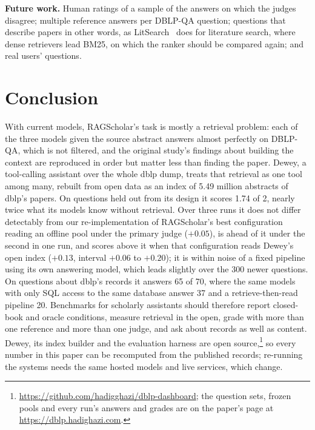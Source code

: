 \documentclass[conference]{IEEEtran}
\newcommand{\dq}{DBLP-QA}
\begin{document}
\textbf{Future work.} Human ratings of a sample of the answers on which the judges disagree; multiple
reference answers per \dq{} question; questions that describe papers in other words, as
LitSearch~\cite{ajith2024litsearch} does for literature search, where dense retrievers lead BM25, on
which the ranker should be compared again; and real users' questions.

\section{Conclusion}

With current models, RAGScholar's task is mostly a retrieval problem: each of the three models given
the source abstract answers almost perfectly on \dq{}, which is not filtered, and the original study's findings about building the context are
reproduced in order but matter less than finding the paper. Dewey, a tool-calling assistant over the
whole dblp dump, treats that retrieval as one tool among many, rebuilt from open data as an index of 5.49
million abstracts of dblp's papers. On questions held out from its design it scores 1.74 of 2, nearly
twice what its models know without retrieval. Over three runs it does not differ detectably from our
re-implementation of RAGScholar's best configuration reading an offline pool under the primary judge
($+0.05$), is ahead of it under the second in one run, and scores above it when that configuration reads
Dewey's open index ($+0.13$, interval $+0.06$ to $+0.20$); it is within noise of a fixed pipeline using its
own answering model, which leads slightly over the 300 newer questions. On questions about dblp's records
it answers 65 of 70, where the same models with only SQL access to the same database answer 37 and a
retrieve-then-read pipeline 20. Benchmarks for scholarly assistants should therefore report closed-book and oracle conditions,
measure retrieval in the open, grade with more than one reference and more than one judge, and ask about
records as well as content. Dewey, its index builder and the evaluation harness are open
source,\footnote{\url{https://github.com/hadigghazi/dblp-dashboard}; the question sets, frozen pools
and every run's answers and grades are on the paper's page at \url{https://dblp.hadighazi.com}.} so every
number in this paper can be recomputed from the published records; re-running the systems needs the same
hosted models and live services, which change.
\end{document}
